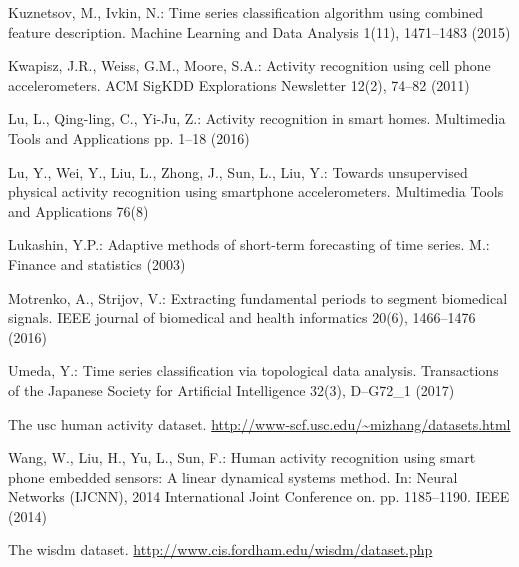 \documentclass{llncs}
\begin{document}
\begin{thebibliography}{10}
	Kuznetsov, M., Ivkin, N.: Time series classification algorithm using combined
	feature description. Machine Learning and Data Analysis  1(11),  1471--1483
	(2015)
	
	Kwapisz, J.R., Weiss, G.M., Moore, S.A.: Activity recognition using cell phone
	accelerometers. ACM SigKDD Explorations Newsletter  12(2),  74--82 (2011)
	
	Lu, L., Qing-ling, C., Yi-Ju, Z.: Activity recognition in smart homes.
	Multimedia Tools and Applications pp. 1--18 (2016)
	
	Lu, Y., Wei, Y., Liu, L., Zhong, J., Sun, L., Liu, Y.: Towards unsupervised
	physical activity recognition using smartphone accelerometers. Multimedia
	Tools and Applications  76(8)
	
	Lukashin, Y.P.: Adaptive methods of short-term forecasting of time series. M.:
	Finance and statistics  (2003)
	
	Motrenko, A., Strijov, V.: Extracting fundamental periods to segment biomedical
	signals. IEEE journal of biomedical and health informatics  20(6),
	1466--1476 (2016)
	
	Umeda, Y.: Time series classification via topological data analysis.
	Transactions of the Japanese Society for Artificial Intelligence  32(3),
	D--G72\_1 (2017)
	
	The usc human activity dataset.
	\url{http://www-scf.usc.edu/~mizhang/datasets.html}
	
	Wang, W., Liu, H., Yu, L., Sun, F.: Human activity recognition using smart
	phone embedded sensors: A linear dynamical systems method. In: Neural
	Networks (IJCNN), 2014 International Joint Conference on. pp. 1185--1190.
	IEEE (2014)
	
	The wisdm dataset. \url{http://www.cis.fordham.edu/wisdm/dataset.php}
	
\end{thebibliography}
\end{document}
